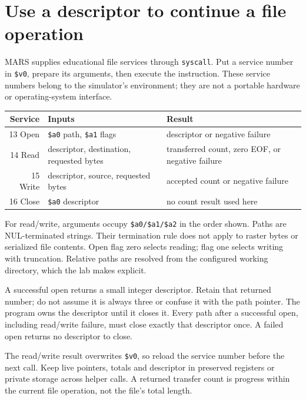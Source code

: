 \section{Use a descriptor to continue a file operation}

MARS supplies educational file services through \texttt{syscall}. Put a service
number in \texttt{\$v0}, prepare its arguments, then execute the instruction.
These service numbers belong to the simulator's environment; they are not a
portable hardware or operating-system interface.

\begin{center}
  \begin{tabular}{r l l}
    \toprule
    Service  & Inputs                                   & Result                                           \\
    \midrule
    13 Open  & \texttt{\$a0} path, \texttt{\$a1} flags  & descriptor or negative failure                   \\
    14 Read  & descriptor, destination, requested bytes & transferred count, zero EOF, or negative failure \\
    15 Write & descriptor, source, requested bytes      & accepted count or negative failure               \\
    16 Close & \texttt{\$a0} descriptor                 & no count result used here                        \\
    \bottomrule
  \end{tabular}
\end{center}
For read/write, arguments occupy \texttt{\$a0/\$a1/\$a2} in the order shown.
Paths are NUL-terminated strings. Their termination rule does not apply to raster
bytes or serialized file contents. Open flag zero selects reading; flag one
selects writing with truncation. Relative paths are resolved from the configured
working directory, which the lab makes explicit.

A successful open returns a small integer descriptor. Retain that returned
number; do not assume it is always three or confuse it with the path pointer.
The program owns the descriptor until it closes it. Every path after a successful
open, including read/write failure, must close exactly that descriptor once.
A failed open returns no descriptor to close.

The read/write result overwrites \texttt{\$v0}, so reload the service number
before the next call. Keep live pointers, totals and descriptor in preserved
registers or private storage across helper calls. A returned transfer count is
progress within the current file operation, not the file's total length.

